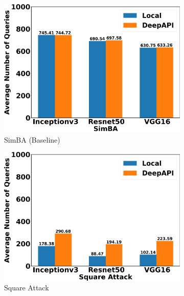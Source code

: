 \begin{figure}[bth]
\centering
\begin{subfigure}[b]{0.31\textwidth}
    \centering
    \includegraphics[width=\textwidth]{figures/chapter_classification/simba_number_of_queries.png}
    \caption{SimBA (Baseline)}
    \label{fig:simba_queries}
\end{subfigure}
\hfill
\begin{subfigure}[b]{0.31\textwidth}
    \centering
    \includegraphics[width=\textwidth]{figures/chapter_classification/square_number_of_queries.png}
    \caption{Square Attack}
    \label{fig:square_queries}
\end{subfigure}
\hfill
\begin{subfigure}[b]{0.31\textwidth}
    \centering

\end{subfigure}
\end{figure}
